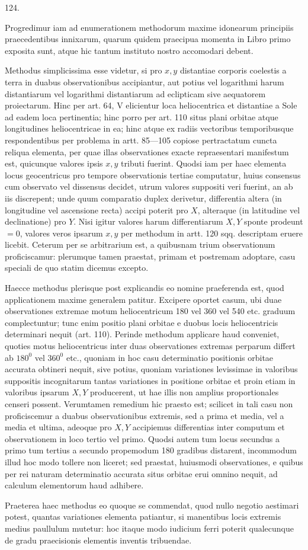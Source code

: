 \par{}\medskip
\begin{center}\hypertarget{native-171-article124}{}124.\end{center}
Progredimur iam ad enumerationem methodorum maxime idonearum principiis
praecedentibus innixarum, quarum quidem praecipua momenta in Libro
primo exposita sunt, atque hic tantum instituto nostro accomodari debent.

Methodus simplicissima esse videtur, si pro $x,y$ distantiae corporis coelestis
a terra in duabus observationibus accipiantur, aut potius vel logarithmi
harum distantiarum vel logarithmi distantiarum ad eclipticam sive aequatorem
proiectarum. Hinc per art. 64, V elicientur loca heliocentrica et distantiae a
Sole ad eadem loca pertinentia; hinc porro per art. 110 situs plani orbitae
atque longitudines heliocentricae in ea; hinc atque ex radiis vectoribus temporibusque
respondentibus per problema in artt. 85—105 copiose pertractatum
cuncta reliqua elementa, per quae illas observationes exacte repraesentari
manifestum est, quicunque valores ipsis $x,y$ tributi fuerint. Quodsi iam per
haec elementa locus geocentricus pro tempore observationis tertiae computatur,
huius consensus cum observato vel dissensus decidet, utrum valores suppositi
veri fuerint, an ab iis discrepent; unde quum comparatio duplex derivetur,
differentia altera (in longitudine vel ascensione recta) accipi poterit pro
$X$, alteraque (in latitudine vel declinatione) pro $Y$. Nisi igitur valores harum
differentiarum $X,Y$ sponte prodeunt $=0$, valores veros ipsarum $x,y$ per methodum
in artt. 120 sqq. descriptam eruere licebit. Ceterum per se arbitrarium
est, a quibusnam trium observationum proficiscamur: plerumque tamen praestat,
primam et postremam adoptare, casu speciali de quo statim dicemus excepto.

Haecce methodus plerisque post explicandis eo nomine praeferenda est,
quod applicationem maxime generalem patitur. Excipere oportet casum, ubi
duae observationes extremae motum heliocentricum 180 vel 360 vel 540 etc.
graduum complectuntur; tunc enim positio plani orbitae e duobus locis heliocentricis
determinari nequit (art. 110). Perinde methodum applicare haud conveniet,
quoties motus heliocentricus inter duas observationes extremas perparum
differt ab $180^0$ vel $360^0$ etc., quoniam in hoc casu determinatio positionis
orbitae accurata obtineri nequit, sive potius, quoniam variationes levissimae
in valoribus suppositis incognitarum tantas variationes in positione orbitae
et proin etiam in valoribus ipsarum $X,Y$ producerent, ut hae illis non
amplius proportionales censeri possent. Verumtamen remedium hic praesto
est; scilicet in tali casu non proficiscemur a duabus observationibus extremis,
sed a prima et media, vel a media et ultima, adeoque pro $X,Y$ accipiemus
differentias inter computum et observationem in loco tertio vel primo. Quodsi
autem tum locus secundus a primo tum tertius a secundo propemodum 180
gradibus distarent, incommodum illud hoc modo tollere non liceret; sed praestat,
huiusmodi observationes, e quibus per rei naturam determinatio accurata
situs orbitae erui omnino nequit, ad calculum elementorum haud adhibere.

Praeterea haec methodus eo quoque se commendat, quod nullo negotio
aestimari potest, quantas variationes elementa patiantur, si manentibus locis
extremis medius paullulum mutetur: hoc itaque modo iudicium ferri poterit
qualecunque de gradu praecisionis elementis inventis tribuendae.
